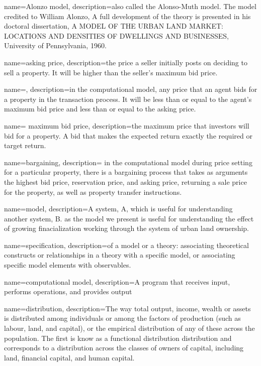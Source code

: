 {
name=Alonzo model,
description={also called the Alonso-Muth model. The model credited to William Alonzo, A full development of the theory is presented in his doctoral dissertation, A MODEL OF THE URBAN LAND MARKET: LOCATIONS AND DENSITIES OF DWELLINGS AND BUSINESSES, University of Pennsylvania, 1960. }
}

{
name=asking price,
description={the price a seller initially posts on deciding to sell a property. It will be higher than the seller's maximum bid price.}
}

{
name=,
description={in  the computational model, any price that an agent bids for a property in the transaction process. It will be less than or equal to the agent's maximum bid price and less than or equal to the asking price.}
}

{
name= maximum bid price,
description={the maximum price that investors will bid for a property. A bid that makes the expected return exactly the required or  target return.}
}

{
name=bargaining,
description= {in the computational model during price setting for a particular property, there is a bargaining process that takes as arguments the highest bid price, reservation price, and asking price, returning a sale price for the property, as well as property transfer instructions.}
}


{
name=model,
description={A system, A, which is useful for understanding another system, B. as the model we present is useful for understanding the effect of growing finacialization working through the system of urban land ownership. }
}

{
name=specification,
description={of a model or a theory: associating theoretical constructs or relationships in a theory with a specific model, or associating specific model elements with observables. }
}

{
name=computational model,
description={A program that receives input, performs operations, and provides output}
}

{
name=distribution,
description={The way total output, income, wealth or assets is distributed among individuals or among the factors of production (such as labour, land, and capital), or the empirical distribution of any of these across the population. The first is know as a functional distribution distribution and  corresponds to a distribution across the classes of owners  of capital, including land, financial capital, and human capital. }
}

